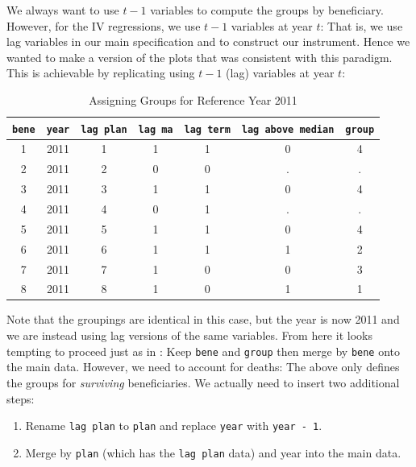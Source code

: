 \documentclass{article}
\begin{document}
We always want to use $t - 1$ variables to compute the groups by
beneficiary. However, for the IV regressions, we use $t - 1$ variables
at year $t$: That is, we use lag variables in our main specification and
to construct our instrument. Hence we wanted to make a version of the
plots that was consistent with this paradigm. This is achievable by
replicating  using
$t - 1$ (lag) variables at year $t$:
\begin{table}[H]
  \centering
  \caption{Assigning Groups for Reference Year 2011}
  \label{tab:assigning_groups_for_reference_year_2011}
  \begin{tabular}{ccccccc}
  \toprule
  \verb`bene` & \verb`year` & \verb`lag plan` & \verb`lag ma` & \verb`lag term` & \verb`lag above median` & \verb`group` \\
  \midrule
  1 & 2011 & 1 & 1 & 1 & 0 & 4 \\
  2 & 2011 & 2 & 0 & 0 & . & . \\
  3 & 2011 & 3 & 1 & 1 & 0 & 4 \\
  4 & 2011 & 4 & 0 & 1 & . & . \\
  5 & 2011 & 5 & 1 & 1 & 0 & 4 \\
  6 & 2011 & 6 & 1 & 1 & 1 & 2 \\
  7 & 2011 & 7 & 1 & 0 & 0 & 3 \\
  8 & 2011 & 8 & 1 & 0 & 1 & 1 \\
  \bottomrule
  \end{tabular}
\end{table}

Note that the groupings are identical in this case, but the year
is now 2011 and we are instead using lag versions of the same
variables. From here it looks tempting to proceed just as in
: Keep \verb`bene` and \verb`group` then
merge by \verb`bene` onto the main data. However, we need to account
for deaths:  The above only defines the groups for \textit{surviving}
beneficiaries. We actually need to insert two additional steps:
\begin{enumerate}
  \item Rename \verb`lag plan` to \verb`plan` and replace \verb`year` with \verb`year - 1`.
  \item Merge by \verb`plan` (which has the \verb`lag plan` data) and year into the main data.
\end{enumerate}
\end{document}
